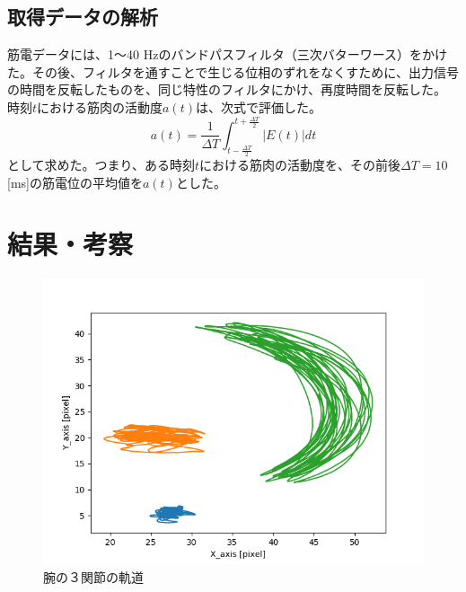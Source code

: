 \documentclass{jsarticle}
\begin{document}
\subsection{取得データの解析}
筋電データには、1〜40 Hzのバンドパスフィルタ（三次バターワース）をかけた。その後、フィルタを通すことで生じる位相のずれをなくすために、出力信号の時間を反転したものを、同じ特性のフィルタにかけ、再度時間を反転した。
時刻$t$における筋肉の活動度$a(t)$は、次式で評価した。
$$a(t) = \frac{1}{\Delta T} \int_{t-\frac{\Delta T}{2}}^{t+\frac{\Delta T}{2}} |E(t)|dt $$
として求めた。つまり、ある時刻$t$における筋肉の活動度を、その前後$\Delta T = 10$ [ms]の筋電位の平均値を$a(t)$とした。

\clearpage
\section{結果・考察}

\begin{figure}[htbp]
	\begin{center} %
		\includegraphics[width=12cm]{graph_image/slow_kidou.png}
		\caption{腕の３関節の軌道} %
		\label{fig:kidou} %
	\end{center}
\end{figure}
\end{document}
